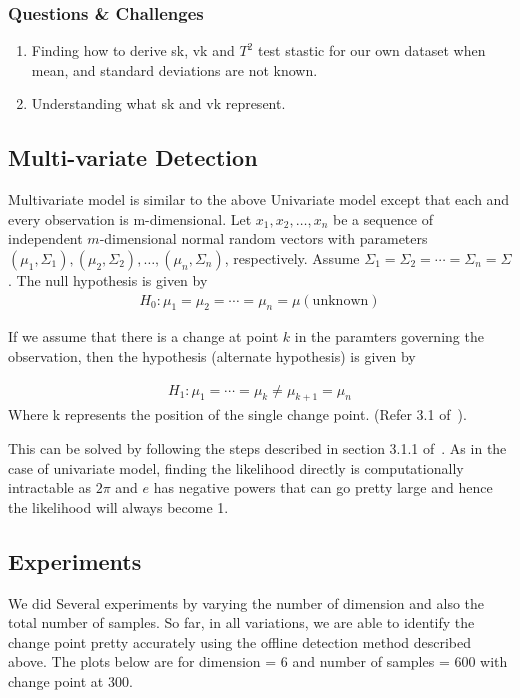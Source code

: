 \documentclass{article}
\begin{document}
\subsubsection{Questions \& Challenges}
\begin{enumerate}
  \item Finding how to derive sk, vk and $T^{2}$ test stastic for our own dataset when mean, and standard deviations are not known.
  \item Understanding what sk and vk represent.
\end{enumerate}

\subsection{Multi-variate Detection}
Multivariate model is similar to the above Univariate model except that each and every observation is m-dimensional.
Let $x_{1}, x_{2}, \ldots , x_{n}$ be a sequence of independent $m$-dimensional normal random vectors with parameters $(\mu_{1}, \Sigma_{1}), (\mu_{2}, \Sigma_{2}), \ldots, (\mu_{n}, \Sigma_{n})$, respectively.
Assume $\Sigma_{1} = \Sigma_{2} = \cdots = \Sigma_{n} = \Sigma $.
The null hypothesis is given by 
\begin{align}
H_{0} : \mu_{1} = \mu_{2} = \cdots = \mu_{n} = \mu (\mathrm{unknown})
\end{align}

If we assume that there is a change at point $k$ in the paramters governing the observation, then the hypothesis (alternate hypothesis) is given by

\begin{align}
H_{1} : \mu_{1} = \cdots = \mu_{k} \ne \mu_{k+1} = \mu_{n}
\end{align}
Where k represents the position of the single change point. (Refer 3.1 of~\cite{birkhauser_pscpa}).

This can be solved by following the steps described in section 3.1.1 of~\cite{birkhauser_pscpa}.  As in the case of univariate model, finding the likelihood directly is computationally intractable as $2\pi$ and $e$ has negative powers that can go pretty large and hence the likelihood will always become 1.

\subsection{Experiments}
We did Several experiments by varying the number of dimension and also the total number of samples.  So far, in all variations, we are able to identify the change point pretty accurately using the offline detection method described above.  The plots below are for dimension = 6 and number of samples = 600 with change point at 300.
\end{document}
